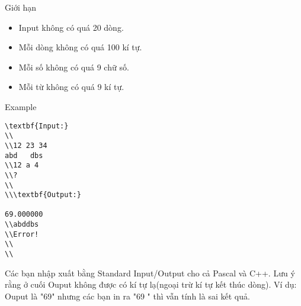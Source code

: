 Giới hạn
\begin{itemize}
	\item     Input không có quá 20 dòng.   
	\item     Mỗi dòng không có quá 100 kí tự.   
	\item     Mỗi số không có quá 9 chữ số.   
	\item     Mỗi từ không có quá 9 kí tự.   
\end{itemize}
Example
\begin{verbatim}
\textbf{Input:}
\\
\\12 23 34
abd   dbs
\\12 a 4 
\\?
\\
\\\textbf{Output:}

69.000000
\\abddbs
\\Error! 
\\
\\\end{verbatim}

Các bạn nhập xuất bằng Standard Input/Output cho cả Pascal và C++. Lưu ý rằng ở cuối Ouput không được có kí tự lạ(ngoại trừ kí tự kết thúc dòng). Ví dụ: Ouput là "69" nhưng các bạn in ra "69 " thì vẫn tính là sai kết quả.